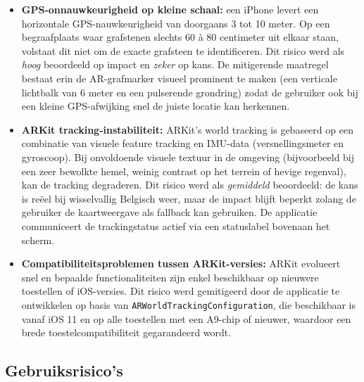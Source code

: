 \begin{itemize}
    \item \textbf{GPS-onnauwkeurigheid op kleine schaal:} een iPhone levert een horizontale GPS-nauwkeurigheid van doorgaans 3 tot 10 meter. Op een begraafplaats waar grafstenen slechts 60 à 80 centimeter uit elkaar staan, volstaat dit niet om de exacte grafsteen te identificeren. Dit risico werd als \textit{hoog} beoordeeld op impact en \textit{zeker} op kans. De mitigerende maatregel bestaat erin de AR-grafmarker visueel prominent te maken (een verticale lichtbalk van 6 meter en een pulserende grondring) zodat de gebruiker ook bij een kleine GPS-afwijking snel de juiste locatie kan herkennen.
    
    \item \textbf{ARKit tracking-instabiliteit:} ARKit's world tracking is gebaseerd op een combinatie van visuele feature tracking en IMU-data (versnellingsmeter en gyroscoop). Bij onvoldoende visuele textuur in de omgeving (bijvoorbeeld bij een zeer bewolkte hemel, weinig contrast op het terrein of hevige regenval), kan de tracking degraderen. Dit risico werd als \textit{gemiddeld} beoordeeld: de kans is reëel bij wisselvallig Belgisch weer, maar de impact blijft beperkt zolang de gebruiker de kaartweergave als fallback kan gebruiken. De applicatie communiceert de trackingstatus actief via een statuslabel bovenaan het scherm.
    
    \item \textbf{Compatibiliteitsproblemen tussen ARKit-versies:} ARKit evolueert snel en bepaalde functionaliteiten zijn enkel beschikbaar op nieuwere toestellen of iOS-versies. Dit risico werd gemitigeerd door de applicatie te ontwikkelen op basis van \texttt{ARWorldTrackingConfiguration}, die beschikbaar is vanaf iOS 11 en op alle toestellen met een A9-chip of nieuwer, waardoor een brede toestelcompatibiliteit gegarandeerd wordt.
\end{itemize}

\subsection{Gebruiksrisico's}

